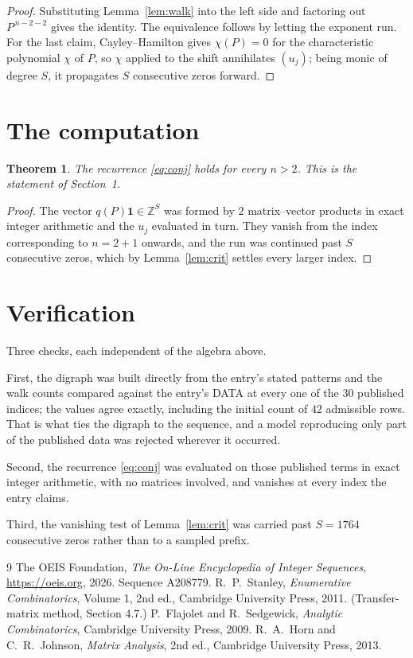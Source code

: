 \documentclass[11pt,a4paper]{article}
\theoremstyle{plain}
\newtheorem{theorem}{Theorem}
\theoremstyle{definition}
\begin{document}
\begin{proof}
Substituting Lemma~\ref{lem:walk} into the left side and factoring out
$P^{\,n-2-2}$ gives the identity. The equivalence follows by letting the exponent
run. For the last claim, Cayley--Hamilton gives $\chi(P)=0$ for the characteristic
polynomial $\chi$ of $P$, so $\chi$ applied to the shift annihilates $(u_j)$; being monic of
degree $S$, it propagates $S$ consecutive zeros forward.
\end{proof}

\section{The computation}

\begin{theorem}
The recurrence \eqref{eq:conj} holds for every $n>2$. This is the statement of
Section~1.
\end{theorem}

\begin{proof}
The vector $q(P)\mathbf{1}\in\mathbb{Z}^{S}$ was formed by $2$ matrix--vector
products in exact integer arithmetic and the $u_j$ evaluated in turn. They vanish from the
index corresponding to $n=2+1$ onwards, and the run was continued past $S$ consecutive
zeros, which by Lemma~\ref{lem:crit} settles every larger index.
\end{proof}

\section{Verification}

Three checks, each independent of the algebra above.

First, the digraph was built directly from the entry's stated patterns and the walk counts
compared against the entry's DATA at every one of the $30$ published indices; the
values agree exactly, including the initial count of $42$ admissible rows. That is
what ties the digraph to the sequence, and a model reproducing only part of the published
data was rejected wherever it occurred.

Second, the recurrence \eqref{eq:conj} was evaluated on those published terms in exact
integer arithmetic, with no matrices involved, and vanishes at every index the entry claims.

Third, the vanishing test of Lemma~\ref{lem:crit} was carried past $S=1764$ consecutive
zeros rather than to a sampled prefix.

\begin{thebibliography}{9}
 The OEIS Foundation, \emph{The On-Line Encyclopedia of Integer
Sequences}, \url{https://oeis.org}, 2026. Sequence A208779.
 R.~P.~Stanley, \emph{Enumerative Combinatorics}, Volume 1, 2nd ed.,
Cambridge University Press, 2011. (Transfer-matrix method, Section 4.7.)
 P.~Flajolet and R.~Sedgewick, \emph{Analytic Combinatorics}, Cambridge
University Press, 2009.
 R.~A.~Horn and C.~R.~Johnson, \emph{Matrix Analysis}, 2nd ed., Cambridge
University Press, 2013.
\end{thebibliography}
\end{document}
